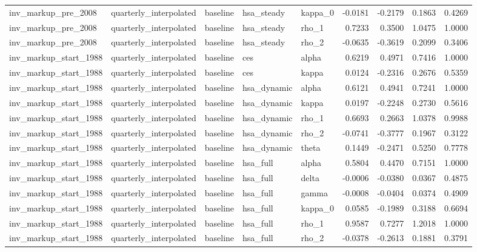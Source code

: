 \begin{tabular}{lllllrrrr}
inv\_markup\_pre\_2008 & quarterly\_interpolated & baseline & hsa\_steady & kappa\_0 & -0.0181 & -0.2179 & 0.1863 & 0.4269 \\
inv\_markup\_pre\_2008 & quarterly\_interpolated & baseline & hsa\_steady & rho\_1 & 0.7233 & 0.3500 & 1.0475 & 1.0000 \\
inv\_markup\_pre\_2008 & quarterly\_interpolated & baseline & hsa\_steady & rho\_2 & -0.0635 & -0.3619 & 0.2099 & 0.3406 \\
inv\_markup\_start\_1988 & quarterly\_interpolated & baseline & ces & alpha & 0.6219 & 0.4971 & 0.7416 & 1.0000 \\
inv\_markup\_start\_1988 & quarterly\_interpolated & baseline & ces & kappa & 0.0124 & -0.2316 & 0.2676 & 0.5359 \\
inv\_markup\_start\_1988 & quarterly\_interpolated & baseline & hsa\_dynamic & alpha & 0.6121 & 0.4941 & 0.7241 & 1.0000 \\
inv\_markup\_start\_1988 & quarterly\_interpolated & baseline & hsa\_dynamic & kappa & 0.0197 & -0.2248 & 0.2730 & 0.5616 \\
inv\_markup\_start\_1988 & quarterly\_interpolated & baseline & hsa\_dynamic & rho\_1 & 0.6693 & 0.2663 & 1.0378 & 0.9988 \\
inv\_markup\_start\_1988 & quarterly\_interpolated & baseline & hsa\_dynamic & rho\_2 & -0.0741 & -0.3777 & 0.1967 & 0.3122 \\
inv\_markup\_start\_1988 & quarterly\_interpolated & baseline & hsa\_dynamic & theta & 0.1449 & -0.2471 & 0.5250 & 0.7778 \\
inv\_markup\_start\_1988 & quarterly\_interpolated & baseline & hsa\_full & alpha & 0.5804 & 0.4470 & 0.7151 & 1.0000 \\
inv\_markup\_start\_1988 & quarterly\_interpolated & baseline & hsa\_full & delta & -0.0006 & -0.0380 & 0.0367 & 0.4875 \\
inv\_markup\_start\_1988 & quarterly\_interpolated & baseline & hsa\_full & gamma & -0.0008 & -0.0404 & 0.0374 & 0.4909 \\
inv\_markup\_start\_1988 & quarterly\_interpolated & baseline & hsa\_full & kappa\_0 & 0.0585 & -0.1989 & 0.3188 & 0.6694 \\
inv\_markup\_start\_1988 & quarterly\_interpolated & baseline & hsa\_full & rho\_1 & 0.9587 & 0.7277 & 1.2018 & 1.0000 \\
inv\_markup\_start\_1988 & quarterly\_interpolated & baseline & hsa\_full & rho\_2 & -0.0378 & -0.2613 & 0.1881 & 0.3791 \\

\end{tabular}
